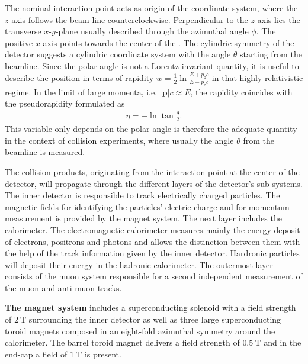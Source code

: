 %
The nominal interaction point acts as origin of the coordinate system, where the $z$-axis follows the beam line counterclockwise. Perpendicular to the $z$-axis lies the transverse $x$-$y$-plane usually described through the azimuthal angle $\phi$. The positive $x$-axis points towards the center of the {\LHC}. The cylindric symmetry of the detector suggests a cylindric coordinate system with the angle $\theta$ starting from the beamline. \cite{ATLASJINST} Since the polar angle is not a Lorentz invariant quantity, it is useful to describe the position in terms of rapidity \cite{LHCJINST} $w=\frac12\ln{\frac{E+p_zc}{E-p_zc}}$ in that highly relativistic regime. In the limit of large momenta, i.e. $|\mathbf{p}|c\approx E$, the rapidity coincides with the pseudorapidity formulated as \cite{ChinaPseudorapidityBook}
\begin{align}
                        \eta=-\ln{\tan\frac{\theta}{2}}\text{.}
\label{pseudorapidity}
\end{align}
This variable only depends on the polar angle is therefore the adequate quantity in the context of collision experiments, where usually the angle $\theta$ from the beamline is measured. \cite{ChinaPseudorapidityBook}\par
The collision products, originating from the interaction point at the center of the {\ATLAS} detector, will propagate through the different layers of the detector's sub-systems. The inner detector is responsible to track electrically charged particles. The magnetic fields for identifying the particles' electric charge and for momentum measurement is provided by the {\ATLAS} magnet system. The next layer includes the calorimeter. The electromagnetic calorimeter measures mainly the energy deposit of electrons, positrons and photons and allows the distinction between them with the help of the track information given by the inner detector. Hardronic particles will deposit their energy in the hadronic calorimeter. The outermost layer consists of the muon system responsible for a second independent measurement of the muon and anti-muon tracks. \cite{ATLASJINST}\par    
\textbf{The magnet system} includes a superconducting solenoid with a field strength of $\SI{2}{\tesla}$ surrounding the inner detector as well as three large superconducting toroid magnets composed in an eight-fold azimuthal symmetry around the calorimeter. The barrel toroid magnet delivers a field strength of $\SI{0.5}{\tesla}$ and in the end-cap a field of $\SI{1}{\tesla}$ is present. \cite{ATLASJINST}\newline%
